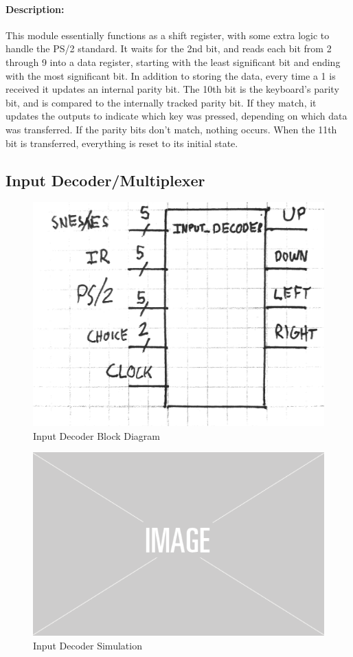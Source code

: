 \documentclass[]{article}
\begin{document}
\paragraph{Description:} This module essentially functions as a shift register, with some extra logic to handle the PS/2 standard.  It waits for the 2nd bit, and reads each bit from 2 through 9 into a data register, starting with the least significant bit and ending with the most significant bit.  In addition to storing the data, every time a 1 is received it updates an internal parity bit.  The 10th bit is the keyboard's parity bit, and is compared to the internally tracked parity bit.  If they match, it updates the outputs to indicate which key was pressed, depending on which data was transferred.  If the parity bits don't match, nothing occurs.  When the 11th bit is transferred, everything is reset to its initial state.

\subsection{Input Decoder/Multiplexer}
\begin{figure}[H]\centering
    \includegraphics[width=0.5\linewidth]{figures/Input_Decoder_Block.jpg}
    \caption{Input Decoder Block Diagram}
    \label{fig:inputDecoderBlock}
\end{figure}
\begin{figure}[H]\centering
    \includegraphics[width=0.5\linewidth]{figures/placeholder.png}
    \caption{Input Decoder Simulation}
    \label{fig:inputDecoderSum}
\end{figure}
\end{document}
